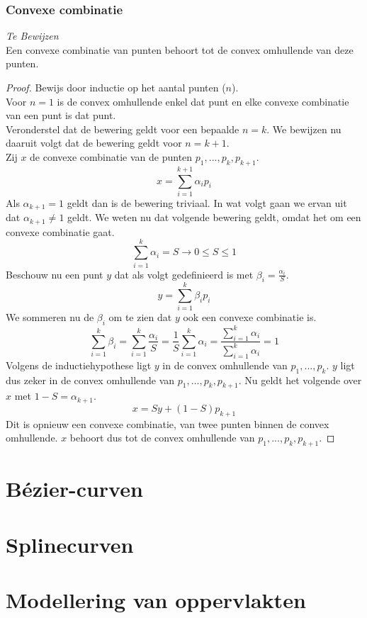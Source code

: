 \documentclass[10pt,a4paper,oneside]{book}
\begin{document}
\subsection{Convexe combinatie}
\textit{Te Bewijzen}\\
Een convexe combinatie van punten behoort tot de convex omhullende van deze punten.
\begin{proof}
Bewijs door inductie op het aantal punten ($n$).\\
Voor $n=1$ is de convex omhullende enkel dat punt en elke convexe combinatie van een punt is dat punt.\\
Veronderstel dat de bewering geldt voor een bepaalde $n=k$. We bewijzen nu daaruit volgt dat de bewering geldt voor $n=k+1$.\\
Zij $x$ de convexe combinatie van de punten $p_1,...,p_k,p_{k+1}$.
\[
x = \sum_{i=1}^{k+1}\alpha_ip_i
\]
Als $\alpha_{k+1} = 1$ geldt dan is de bewering triviaal. In wat volgt gaan we ervan uit dat $\alpha_{k+1} \neq 1$ geldt.
We weten nu dat volgende bewering geldt, omdat het om een convexe combinatie gaat.
\[
\sum_{i=1}^{k}\alpha_i = S \rightarrow 0 \le S \le 1
\]
Beschouw nu een punt $y$ dat als volgt gedefinieerd is met $\beta_i = \frac{\alpha_i}{S}$.
\[
y = \sum_{i=1}^k\beta_{i}p_{i}
\]
We sommeren nu de $\beta_i$ om te zien dat $y$ ook een convexe combinatie is.
\[
\sum_{i=1}^k\beta_{i} = \sum_{i=1}^k \frac{\alpha_i}{S} = \frac{1}{S}\sum_{i=1}^k \alpha_i = \frac{\sum_{i=1}^{k}\alpha_i}{\sum_{i=1}^{k}\alpha_i} = 1
\]
Volgens de inductiehypothese ligt $y$ in de convex omhullende van $p_1,...,p_k$. $y$ ligt dus zeker in de convex omhullende van $p_1,...,p_k,p_{k+1}$. Nu geldt het volgende over $x$ met $1-S = \alpha_{k+1}$.
\[
x = Sy + (1-S)p_{k+1}
\]
Dit is opnieuw een convexe combinatie, van twee punten binnen de convex omhullende. $x$ behoort dus tot de convex omhullende van $p_1,...,p_k,p_{k+1}$. 
\end{proof}

\chapter{B\'ezier-curven}
\chapter{Splinecurven}
\chapter{Modellering van oppervlakten}
\end{document}
